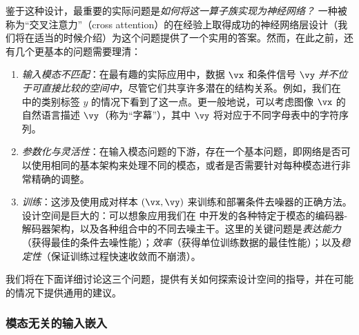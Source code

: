 \documentclass[../../book-main_zh.tex]{subfiles}
\begin{document}
鉴于这种设计，最重要的实际问题是\textit{如何将这一算子族实现为神经网络？}
一种被称为“交叉注意力”（cross attention）的在经验上取得成功的神经网络层设计（我们将在适当的时候介绍）为这个问题提供了一个实用的答案。然而，在此之前，还有几个更基本的问题需要理清：
\begin{enumerate}
    \item \textit{输入模态不匹配}：在最有趣的实际应用中，数据 $\vx$ 和条件信号 $\vy$
        \textit{并不位于可直接比较的空间中}，尽管它们共享许多潜在的结构关系。例如，我们在
         中的类别标签 $y$ 的情况下看到了这一点。更一般地说，可以考虑图像 $\vx$ 的自然语言描述 $\vy$（称为“字幕”），其中 $\vy$ 将对应于不同字母表中的字符序列。
    \item \textit{参数化与灵活性}：在输入模态问题的下游，存在一个基本问题，即网络是否可以使用相同的基本架构来处理不同的模态，或者是否需要针对每种模态进行非常精确的调整。
    \item \textit{训练}：这涉及使用成对样本 $(\vx, \vy)$ 来训练和部署条件去噪器的正确方法。
        设计空间是巨大的：可以想象应用我们在
         中开发的各种特定于模态的编码器-解码器架构，以及各种组合中的不同去噪主干。这里的关键问题是\textit{表达能力}（获得最佳的条件去噪性能）；\textit{效率}（获得单位训练数据的最佳性能）；以及\textit{稳定性}（保证训练过程快速收敛而不崩溃）。
\end{enumerate}

我们将在下面详细讨论这三个问题，提供有关如何探索设计空间的指导，并在可能的情况下提供通用的建议。

\subsubsection{模态无关的输入嵌入}
\end{document}
